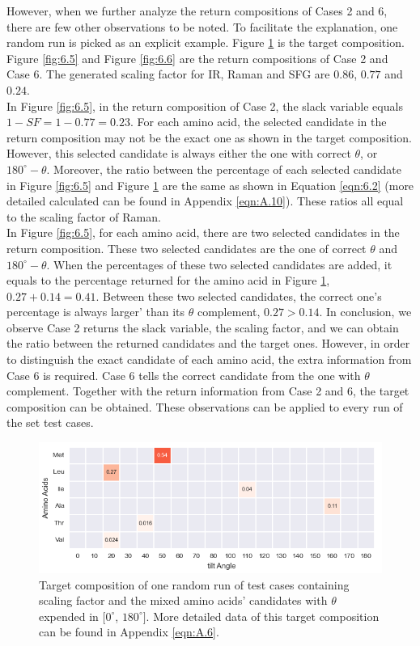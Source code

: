 However, when we further analyze the return compositions of Cases 2 and 6, there are few other observations to be noted. To facilitate the explanation, one random run is picked as an explicit example. Figure \ref{fig:6.4} is the target composition. Figure \ref{fig:6.5} and Figure \ref{fig:6.6} are the return compositions of Case 2 and Case 6. The generated scaling factor for IR, Raman and SFG are $0.86$, $0.77$ and $0.24$. \\

In Figure \ref{fig:6.5}, in the return composition of Case 2, the slack variable equals $1-SF = 1-0.77 = 0.23$. For each amino acid, the selected candidate in the return composition may not be the exact one as shown in the target composition. However, this selected candidate is always either the one with correct $\theta$, or $180^{\circ}-\theta$. Moreover, the ratio between the percentage of each selected candidate in Figure \ref{fig:6.5} and Figure \ref{fig:6.4} are the same as shown in Equation \ref{eqn:6.2} (more detailed calculated can be found in Appendix \ref{eqn:A.10}). These ratios all equal to the scaling factor of Raman. \\

In Figure \ref{fig:6.5}, for each amino acid, there are two selected candidates in the return composition. These two selected candidates are the one of correct $\theta$ and $180^{\circ}-\theta$. When the percentages of these two selected candidates are added, it equals to the percentage returned for the amino acid in Figure \ref{fig:6.4}, $0.27 + 0.14 = 0.41$. Between these two selected candidates, the correct one's percentage is always larger' than its $\theta$ complement, $0.27 > 0.14$. In conclusion, we observe Case 2 returns the slack variable, the scaling factor, and we can obtain the ratio between the returned candidates and the target ones. However, in order to distinguish the exact candidate of each amino acid, the extra information from Case 6 is required. Case 6 tells the correct candidate from the one with $\theta$ complement. Together with the return information from Case 2 and 6, the target composition can be obtained. These observations can be applied to every run of the set test cases.\\


\begin{figure}[!ht] 
\centering
\includegraphics[scale=0.7]{Figures/chapter6_figure_five.png}
\caption{Target composition of one random run of test cases containing scaling factor and the mixed amino acids' candidates with $\theta$ expended in $[0^{\circ}$, $180^{\circ}]$. More detailed data of this target composition can be found in Appendix \ref{eqn:A.6}.} \label{fig:6.4}
\end{figure}

